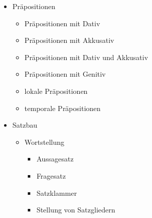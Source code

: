 \documentclass[a4paper]{article}
\begin{document}
\begin{itemize}
\begin{itemize}
                \item Akkusativ
                \begin{itemize}
                    \item direktes Objekt
                    \item Akkusativ nach Präpositionen
                    \item temporaler Akkusativ
                \end{itemize}
                
                \item Dativ
                \begin{itemize}
                    \item indirektes Objekt
                    \item Dativ nach Präpositionen
                    \item freier Dativ
                \end{itemize}
                
                \item Genitiv
                \begin{itemize}
                    \item Genitiv als Attribut
                    \item Genitiv bei Namen
                    \item Präpositionen mit Genitiv
                \end{itemize}
            \end{itemize}
            
            \item Präpositionen
            \begin{itemize}
                \item Präpositionen mit Dativ
                \item Präpositionen mit Akkusativ
                \item Präpositionen mit Dativ und Akkusativ
                \item Präpositionen mit Genitiv
                \item lokale Präpositionen
                \item temporale Präpositionen
            \end{itemize}
            
            \item Satzbau
            \begin{itemize}
                \item Wortstellung
                \begin{itemize}
                    \item Aussagesatz
                    \item Fragesatz
                    \item Satzklammer
                    \item Stellung von Satzgliedern
                \end{itemize}
                

\end{itemize}
\end{itemize}
\end{document}

